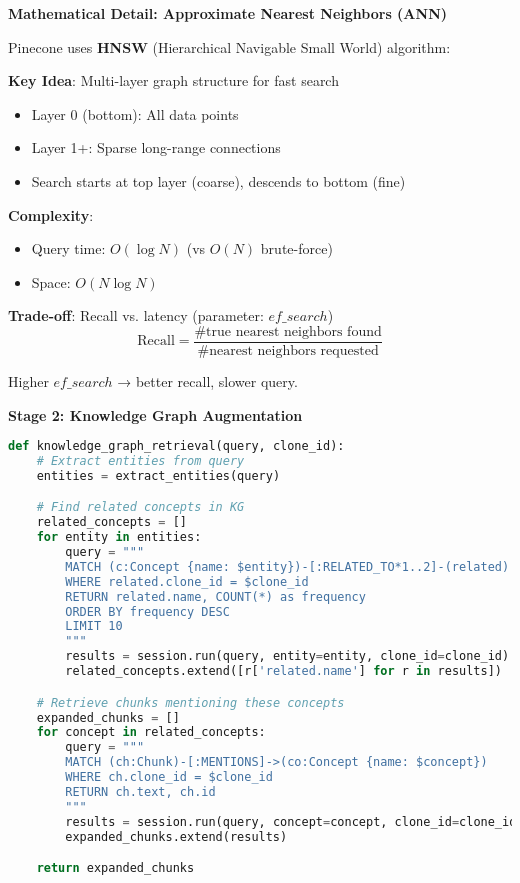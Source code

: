 \documentclass[10pt]{article}
\begin{document}
\textbf{Mathematical Detail: Approximate Nearest Neighbors (ANN)}

Pinecone uses \textbf{HNSW} (Hierarchical Navigable Small World) algorithm:

\textbf{Key Idea}: Multi-layer graph structure for fast search
\begin{itemize}[leftmargin=*]
    \item Layer 0 (bottom): All data points
    \item Layer 1+: Sparse long-range connections
    \item Search starts at top layer (coarse), descends to bottom (fine)
\end{itemize}

\textbf{Complexity}:
\begin{itemize}[leftmargin=*]
    \item Query time: $O(\log N)$ (vs $O(N)$ brute-force)
    \item Space: $O(N \log N)$
\end{itemize}

\textbf{Trade-off}: Recall vs. latency (parameter: $ef\_search$)
\[
\text{Recall} = \frac{\text{\# true nearest neighbors found}}{\text{\# nearest neighbors requested}}
\]

Higher $ef\_search$ → better recall, slower query.

\textbf{Stage 2: Knowledge Graph Augmentation}
\begin{lstlisting}[language=Python]
def knowledge_graph_retrieval(query, clone_id):
    # Extract entities from query
    entities = extract_entities(query)

    # Find related concepts in KG
    related_concepts = []
    for entity in entities:
        query = """
        MATCH (c:Concept {name: $entity})-[:RELATED_TO*1..2]-(related)
        WHERE related.clone_id = $clone_id
        RETURN related.name, COUNT(*) as frequency
        ORDER BY frequency DESC
        LIMIT 10
        """
        results = session.run(query, entity=entity, clone_id=clone_id)
        related_concepts.extend([r['related.name'] for r in results])

    # Retrieve chunks mentioning these concepts
    expanded_chunks = []
    for concept in related_concepts:
        query = """
        MATCH (ch:Chunk)-[:MENTIONS]->(co:Concept {name: $concept})
        WHERE ch.clone_id = $clone_id
        RETURN ch.text, ch.id
        """
        results = session.run(query, concept=concept, clone_id=clone_id)
        expanded_chunks.extend(results)

    return expanded_chunks
\end{lstlisting}
\end{document}
